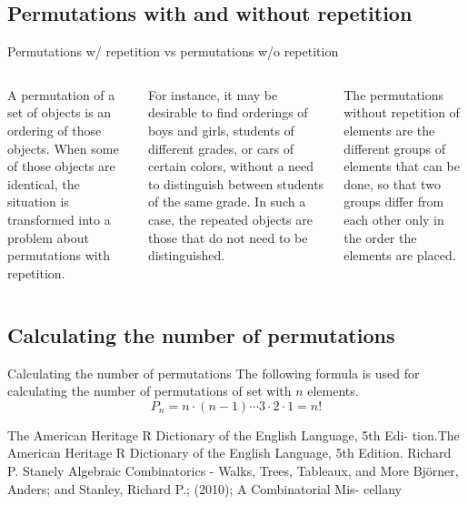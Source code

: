 \documentclass[11pt]{beamer}
\begin{document}
	\subsection{Permutations with and without repetition}
	\begin{frame}{Permutations w/ repetition vs permutations w/o repetition}
	\begin{columns}
		\column[T]{6cm}
		A permutation of a set of objects is an ordering of those objects. When some of those objects are identical, the situation is transformed into a problem about permutations with repetition.
		
		For instance, it may be desirable to find orderings of boys and girls, students of different grades, or cars of certain colors, without a need to distinguish between students of the same grade. In such a case, the repeated objects are those that do not need to be distinguished.
		
		\column[T]{6cm}
		The permutations without repetition of elements are the different groups of elements that can be done, so that two groups differ from each other only in the order the elements are placed.
	\end{columns}
	\end{frame}


	\subsection{Calculating the number of permutations}
	\begin{frame}{Calculating the number of permutations}
	The following formula is used for calculating the number of permutations of set with $n$ elements.
	$$P_n=n\cdot\left(n-1\right)\cdots 3\cdot 2\cdot 1=n!$$
	
	\end{frame}
		
	\begin{frame}
		\begin{thebibliography}{4}
			The American Heritage R Dictionary of the English Language, 5th Edi-
			tion.The American Heritage R Dictionary of the English Language, 5th
			Edition.
			Richard P. Stanely Algebraic Combinatorics - Walks, Trees, Tableaux,
			and More
			Björner, Anders; and Stanley, Richard P.; (2010); A Combinatorial Mis-
			cellany
		\end{thebibliography}
	\end{frame}
\end{document}
